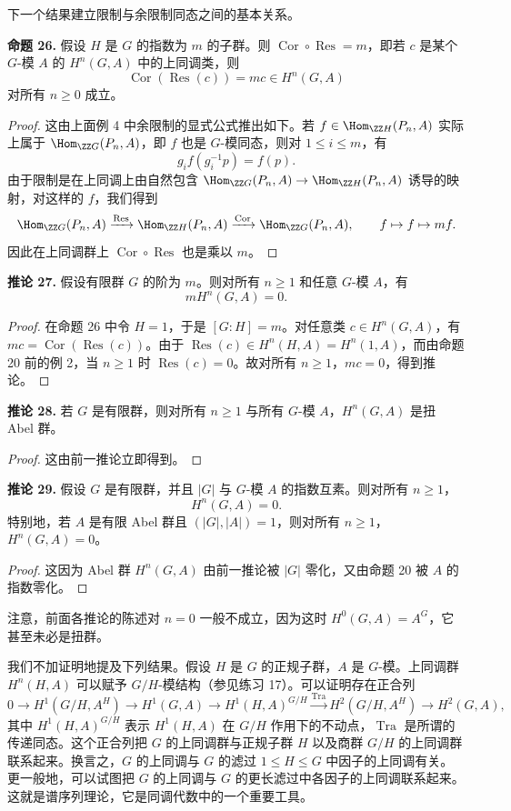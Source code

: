 下一个结果建立限制与余限制同态之间的基本关系。

\medskip
\noindent\textbf{命题 26.} 假设 $H$ 是 $G$ 的指数为 $m$ 的子群。则 $\operatorname{Cor}\circ\operatorname{Res}=m$，即若 $c$ 是某个 $G$-模 $A$ 的 $H^n(G,A)$ 中的上同调类，则
\[
  \operatorname{Cor}(\operatorname{Res}(c))=mc\in H^n(G,A)
\]
对所有 $n\geq0$ 成立。

\begin{proof}
这由上面例 4 中余限制的显式公式推出如下。若 $f\in\Hom_{\ZZ H}(P_n,A)$ 实际上属于 $\Hom_{
\ZZ G}(P_n,A)$，即 $f$ 也是 $G$-模同态，则对 $1\leq i\leq m$，有
\[
  g_if(g_i^{-1}p)=f(p).
\]
由于限制是在上同调上由自然包含 $\Hom_{\ZZ G}(P_n,A)\to\Hom_{\ZZ H}(P_n,A)$ 诱导的映射，对这样的 $f$，我们得到
\[
  \Hom_{\ZZ G}(P_n,A)\xrightarrow{\operatorname{Res}}\Hom_{\ZZ H}(P_n,A)\xrightarrow{\operatorname{Cor}}\Hom_{\ZZ G}(P_n,A),
  \qquad f\mapsto f\mapsto mf.
\]
因此在上同调群上 $\operatorname{Cor}\circ\operatorname{Res}$ 也是乘以 $m$。
\end{proof}

\medskip
\noindent\textbf{推论 27.} 假设有限群 $G$ 的阶为 $m$。则对所有 $n\geq1$ 和任意 $G$-模 $A$，有
\[
  mH^n(G,A)=0.
\]

\begin{proof}
在命题 26 中令 $H=1$，于是 $[G:H]=m$。对任意类 $c\in H^n(G,A)$，有 $mc=\operatorname{Cor}(\operatorname{Res}(c))$。由于 $\operatorname{Res}(c)\in H^n(H,A)=H^n(1,A)$，而由命题 20 前的例 2，当 $n\geq1$ 时 $\operatorname{Res}(c)=0$。故对所有 $n\geq1$，$mc=0$，得到推论。
\end{proof}

\medskip
\noindent\textbf{推论 28.} 若 $G$ 是有限群，则对所有 $n\geq1$ 与所有 $G$-模 $A$，$H^n(G,A)$ 是扭 Abel 群。

\begin{proof}
这由前一推论立即得到。
\end{proof}

\medskip
\noindent\textbf{推论 29.} 假设 $G$ 是有限群，并且 $|G|$ 与 $G$-模 $A$ 的指数互素。则对所有 $n\geq1$，
\[
  H^n(G,A)=0.
\]
特别地，若 $A$ 是有限 Abel 群且 $(|G|,|A|)=1$，则对所有 $n\geq1$，$H^n(G,A)=0$。

\begin{proof}
这因为 Abel 群 $H^n(G,A)$ 由前一推论被 $|G|$ 零化，又由命题 20 被 $A$ 的指数零化。
\end{proof}

注意，前面各推论的陈述对 $n=0$ 一般不成立，因为这时 $H^0(G,A)=A^G$，它甚至未必是扭群。

我们不加证明地提及下列结果。假设 $H$ 是 $G$ 的正规子群，$A$ 是 $G$-模。上同调群 $H^n(H,A)$ 可以赋予 $G/H$-模结构（参见练习 17）。可以证明存在正合列
\[
0\to H^1(G/H,A^H)\to H^1(G,A)\to H^1(H,A)^{G/H}
\xrightarrow{\operatorname{Tra}}H^2(G/H,A^H)\to H^2(G,A),
\]
其中 $H^1(H,A)^{G/H}$ 表示 $H^1(H,A)$ 在 $G/H$ 作用下的不动点，$\operatorname{Tra}$ 是所谓的传递同态。这个正合列把 $G$ 的上同调群与正规子群 $H$ 以及商群 $G/H$ 的上同调群联系起来。换言之，$G$ 的上同调与 $G$ 的滤过 $1\leq H\leq G$ 中因子的上同调有关。更一般地，可以试图把 $G$ 的上同调与 $G$ 的更长滤过中各因子的上同调联系起来。这就是谱序列理论，它是同调代数中的一个重要工具。

